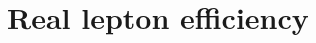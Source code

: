 \documentclass[hyperlinks]{outhesis}
\begin{document}
\chapter{Real lepton efficiency}
\label{app:rle}
\graphicspath{{figures/rle/}}





% 
% 

\end{document}
